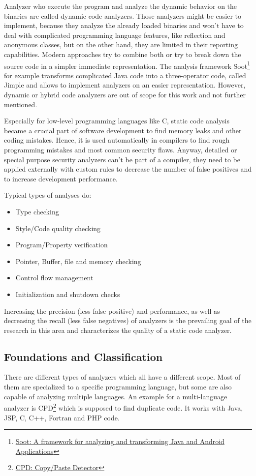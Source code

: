 \documentclass[conference]{IEEEtran}
\begin{document}
Analyzer who execute the program and analyze the dynamic behavior on the binaries are called dynamic code analyzers.
Those analyzers might be easier to implement, because they analyze the already loaded binaries and won't have to deal with complicated programming language features, like reflection and anonymous classes, but on the other hand, they are limited in their reporting capabilities.
Modern approaches try to combine both or try to break down the source code in a simpler immediate representation.
The analysis framework Soot\footnote{\href{https://sable.github.io/soot/}{Soot: A framework for analyzing and transforming Java and Android Applications}} for example transforms complicated Java code into a three-operator code, called Jimple and allows to implement analyzers on an easier representation.
However, dynamic or hybrid code analyzers are out of scope for this work and not further mentioned.


Especially for low-level programming languages like C, static code analysis became a crucial part of software development to find memory leaks and other coding mistakes.
Hence, it is used automatically in compilers to find rough programming mistakes and most common security flaws.
Anyway, detailed or special purpose security analyzers can't be part of a compiler, they need to be applied externally with custom rules to decrease the number of false positives and to increase development performance.

Typical types of analyses do:
\begin{itemize}
	\item Type checking
	\item Style/Code quality checking
	\item Program/Property verification
	\item Pointer, Buffer, file and memory checking
	\item Control flow management
	\item Initialization and shutdown checks
\end{itemize}

Increasing the precision (less false positive) and performance, as well as decreasing the recall (less false negatives) of analyzers is the prevailing goal of the research in this area and characterizes the quality of a static code analyzer.


\subsection{Foundations and Classification}
\label{subsec:static_code_analysis_foundations}
There are different types of analyzers which all have a different scope. Most of them are specialized to a specific programming language, but some are also capable of analyzing multiple languages. An example for a multi-language analyzer is CPD\footnote{\href{http://pmd.sourceforge.net/pmd-4.3.0/cpd.html}{CPD: Copy/Paste Detector}} which is supposed to find duplicate code. It works with Java, JSP, C, C++, Fortran and PHP code.
\end{document}
